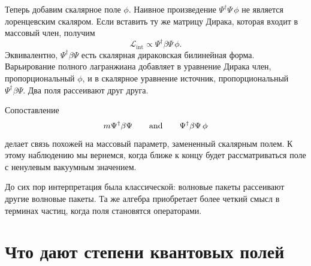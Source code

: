 \begin{classroomqa}
\end{classroomqa}

Теперь добавим скалярное поле \(\phi\). Наивное произведение \(\Psi^\dagger\Psi\,\phi\) не является лоренцевским скаляром. Если вставить ту же матрицу Дирака, которая входит в массовый член, получим
\begin{equation}
\mathcal L_{\mathrm{int}}
\propto
\Psi^\dagger\beta\Psi\,\phi.
\end{equation}
Эквивалентно, \(\Psi^\dagger\beta\Psi\) есть скалярная дираковская билинейная форма. Варьирование полного лагранжиана добавляет в уравнение Дирака член, пропорциональный \(\phi\), и в скалярное уравнение источник, пропорциональный \(\Psi^\dagger\beta\Psi\). Два поля рассеивают друг друга.

\begin{classroomqa}
\end{classroomqa}

Сопоставление
\begin{equation}
m\Psi^\dagger\beta\Psi
\qquad\hbox{and}\qquad
\Psi^\dagger\beta\Psi\,\phi
\end{equation}
делает связь похожей на массовый параметр, замененный скалярным полем. К этому наблюдению мы вернемся, когда ближе к концу будет рассматриваться поле с ненулевым вакуумным значением.

До сих пор интерпретация была классической: волновые пакеты рассеивают другие волновые пакеты. Та же алгебра приобретает более четкий смысл в терминах частиц, когда поля становятся операторами.

\section{Что дают степени квантовых полей}

